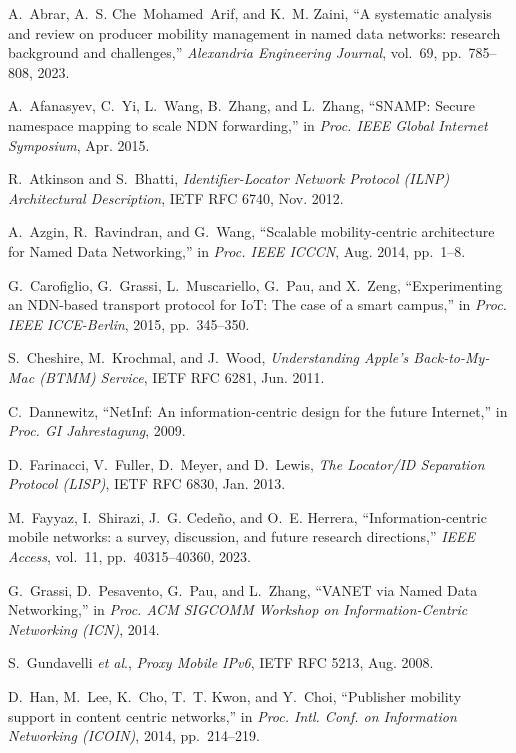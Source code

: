 \begin{thebibliography}{99}

A.~Abrar, A.~S. Che~Mohamed~Arif, and K.~M. Zaini,
``A systematic analysis and review on producer mobility management in named data networks: research background and challenges,''
\textit{Alexandria Engineering Journal},
vol.~69, pp.~785--808, 2023.

A.~Afanasyev, C.~Yi, L.~Wang, B.~Zhang, and L.~Zhang,
``SNAMP: Secure namespace mapping to scale NDN forwarding,''
in \textit{Proc. IEEE Global Internet Symposium},
Apr. 2015.

R.~Atkinson and S.~Bhatti,
\textit{Identifier-Locator Network Protocol (ILNP) Architectural Description},
IETF RFC 6740, Nov. 2012.

A.~Azgin, R.~Ravindran, and G.~Wang,
``Scalable mobility-centric architecture for Named Data Networking,''
in \textit{Proc. IEEE ICCCN}, Aug. 2014, pp.~1--8.

G.~Carofiglio, G.~Grassi, L.~Muscariello, G.~Pau, and X.~Zeng,
``Experimenting an NDN-based transport protocol for IoT: The case of a smart campus,''
in \textit{Proc. IEEE ICCE-Berlin},
2015, pp.~345--350.

S.~Cheshire, M.~Krochmal, and J.~Wood,
\textit{Understanding Apple’s Back-to-My-Mac (BTMM) Service},
IETF RFC 6281, Jun. 2011.

C.~Dannewitz,
``NetInf: An information-centric design for the future Internet,''
in \textit{Proc. GI Jahrestagung},
2009.

D.~Farinacci, V.~Fuller, D.~Meyer, and D.~Lewis,
\textit{The Locator/ID Separation Protocol (LISP)},
IETF RFC 6830, Jan. 2013.

M.~Fayyaz, I.~Shirazi, J.~G. Cedeño, and O.~E. Herrera,
``Information-centric mobile networks: a survey, discussion, and future research directions,''
\textit{IEEE Access},
vol.~11, pp.~40315--40360, 2023.

G.~Grassi, D.~Pesavento, G.~Pau, and L.~Zhang,
``VANET via Named Data Networking,''
in \textit{Proc. ACM SIGCOMM Workshop on Information-Centric Networking (ICN)},
2014.

S.~Gundavelli \textit{et al}.,
\textit{Proxy Mobile IPv6},
IETF RFC 5213, Aug. 2008.

D.~Han, M.~Lee, K.~Cho, T.~T. Kwon, and Y.~Choi,
``Publisher mobility support in content centric networks,''
in \textit{Proc. Intl. Conf. on Information Networking (ICOIN)},
2014, pp.~214--219.


\end{thebibliography}
